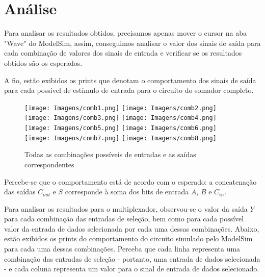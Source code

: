 \documentclass[a4paper,12pt]{article}
\begin{document}
\section{Análise}
Para analisar os resultados obtidos, precisamos apenas mover o cursor na aba "Wave" do ModelSim, assim, conseguimos analisar o valor dos sinais de saída para cada combinação de valores dos sinais de entrada e verificar se os resultados obtidos são os esperados.

A fio, estão exibidos os prints que denotam o comportamento dos sinais de saída para cada possível de estímulo de entrada para o circuito do somador completo.

\begin{figure}[H]
    \captionsetup{skip=0pt} 
    \centering
    \texttt{[image: Imagens/comb1.png]}
    \texttt{[image: Imagens/comb2.png]}
    \texttt{[image: Imagens/comb3.png]}
    \texttt{[image: Imagens/comb4.png]}
    \texttt{[image: Imagens/comb5.png]}
    \texttt{[image: Imagens/comb6.png]}
    \texttt{[image: Imagens/comb7.png]}
    \texttt{[image: Imagens/comb8.png]}
    \caption{Todas as combinações possíveis de entradas e as saídas correspondentes}
\end{figure}

\noindent Percebe-se que o comportamento está de acordo com o esperado: a concatenação das saídas $C_{out}$ e $S$ corresponde à soma dos bits de entrada $A$, $B$ e $C_{in}$.

Para analisar os resultados para o multiplexador, observou-se o valor da saída $Y$ para cada combinação das entradas de seleção, bem como para cada possível valor da entrada de dados selecionada por cada uma dessas combinações. Abaixo, estão exibidos os prints do comportamento do circuito simulado pelo ModelSim para cada uma dessas combinações. Perceba que cada linha representa uma combinação das entradas de seleção - portanto, uma entrada de dados selecionada - e cada coluna representa um valor para o sinal de entrada de dados selecionado.
\end{document}
